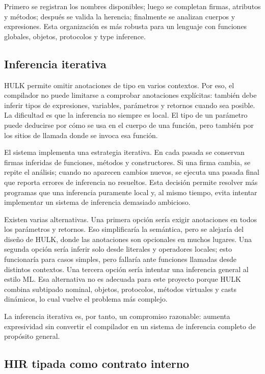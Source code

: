 \documentclass[12pt,letterpaper]{article}
\newcommand{\hulk}{\textsc{HULK}}
\begin{document}
Primero se registran los nombres disponibles; luego se completan firmas, atributos y métodos; después se valida la herencia; finalmente se analizan cuerpos y expresiones. Esta organización es más robusta para un lenguaje con funciones globales, objetos, protocolos y type inference.

\subsection{Inferencia iterativa}

\hulk{} permite omitir anotaciones de tipo en varios contextos. Por eso, el compilador no puede limitarse a comprobar anotaciones explícitas: también debe inferir tipos de expresiones, variables, parámetros y retornos cuando sea posible. La dificultad es que la inferencia no siempre es local. El tipo de un parámetro puede deducirse por cómo se usa en el cuerpo de una función, pero también por los sitios de llamada donde se invoca esa función.

El sistema implementa una estrategia iterativa. En cada pasada se conservan firmas inferidas de funciones, métodos y constructores. Si una firma cambia, se repite el análisis; cuando no aparecen cambios nuevos, se ejecuta una pasada final que reporta errores de inferencia no resueltos. Esta decisión permite resolver más programas que una inferencia puramente local y, al mismo tiempo, evita intentar implementar un sistema de inferencia demasiado ambicioso.

Existen varias alternativas. Una primera opción sería exigir anotaciones en todos los parámetros y retornos. Eso simplificaría la semántica, pero se alejaría del diseño de \hulk{}, donde las anotaciones son opcionales en muchos lugares. Una segunda opción sería inferir solo desde literales y operadores locales; esto funcionaría para casos simples, pero fallaría ante funciones llamadas desde distintos contextos. Una tercera opción sería intentar una inferencia general al estilo ML. Esa alternativa no es adecuada para este proyecto porque \hulk{} combina subtipado nominal, objetos, protocolos, métodos virtuales y casts dinámicos, lo cual vuelve el problema más complejo.

La inferencia iterativa es, por tanto, un compromiso razonable: aumenta expresividad sin convertir el compilador en un sistema de inferencia completo de propósito general.

\subsection{HIR tipada como contrato interno}
\end{document}
